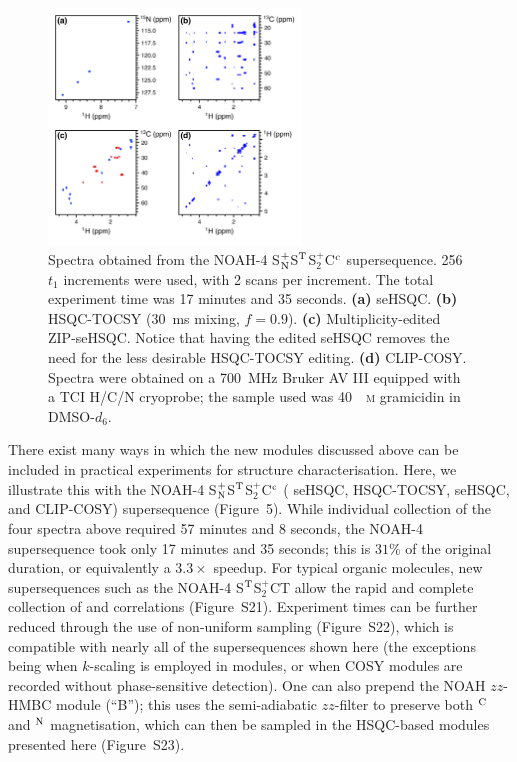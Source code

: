 \documentclass[final,twocolumn]{elsarticle}
\newcommand*{\noahB}{B}
\newcommand*{\noahC}{C}
\newcommand*{\noahCc}{C$\rm ^c$}
\newcommand*{\noahSpb}{S$^+_2$}
\newcommand*{\noahSt}{S$\rm ^T$}
\newcommand*{\noahSpn}{S$\rm ^+_N$}
\newcommand*{\noahT}{T}
\newcommand*{\carbon}{\ce{^{13}C}}
\newcommand*{\nitrogen}{\ce{^{15}N}}
\newcommand*{\magn}[1]{\ce{^1H}$^{#1}$}
\begin{document}
\begin{figure}[!ht]
    \centering
    \includegraphics[width=0.6\textwidth]{spnstspcc.png}
    \caption{
        Spectra obtained from the NOAH-4 \noahSpn{}\noahSt{}\noahSpb{}\noahCc{} supersequence.
        256 $t_1$ increments were used, with 2 scans per increment.
        The total experiment time was 17 minutes and 35 seconds.
        \textbf{(a)} \nitrogen{} seHSQC.
        \textbf{(b)} \carbon{} HSQC-TOCSY (\SI{30}{ms} mixing, $f = 0.9$).
        \textbf{(c)} Multiplicity-edited \carbon{} ZIP-seHSQC. Notice that having the edited seHSQC removes the need for the less desirable HSQC-TOCSY editing.
        \textbf{(d)} CLIP-COSY.
        Spectra were obtained on a \SI{700}{\MHz} Bruker AV III equipped with a TCI H/C/N cryoprobe; the sample used was \SI{40}{\milli\textsc{m}} gramicidin in DMSO-$d_6$.
    }
    \label{fig:spnstspcc}
\end{figure}

There exist many ways in which the new modules discussed above can be included in practical experiments for structure characterisation.
Here, we illustrate this with the NOAH-4 \noahSpn{}\noahSt{}\noahSpb{}\noahCc{} (\nitrogen{} seHSQC, \carbon{} HSQC-TOCSY, \carbon{} seHSQC, and CLIP-COSY) supersequence (Figure~5).
While individual collection of the four spectra above required 57 minutes and 8 seconds, the NOAH-4 supersequence took only 17 minutes and 35 seconds; this is $31\%$ of the original duration, or equivalently a $3.3\times$ speedup.
For typical organic molecules, new supersequences such as the NOAH-4 \noahSt{}\noahSpb{}\noahC{}\noahT{} allow the rapid and complete collection of  and  correlations (Figure~S21).
Experiment times can be further reduced through the use of non-uniform sampling\cite{Kazimierczuk2010PNMRS, Mobli2014PNMRS, Kazimierczuk2015MRC, Golowicz2020PNMRS} (Figure~S22), which is compatible with nearly all of the supersequences shown here (the exceptions being when $k$-scaling is employed in \nitrogen{} modules, or when COSY modules are recorded without phase-sensitive detection).
One can also prepend the NOAH $zz$-HMBC module (``\noahB{}'');\cite{Kupce2018CC, Kupce2019JMR} this uses the semi-adiabatic $zz$-filter to preserve both \magn{\ce{C}} and \magn{\ce{N}} magnetisation, which can then be sampled in the HSQC-based modules presented here (Figure~S23).
\end{document}
